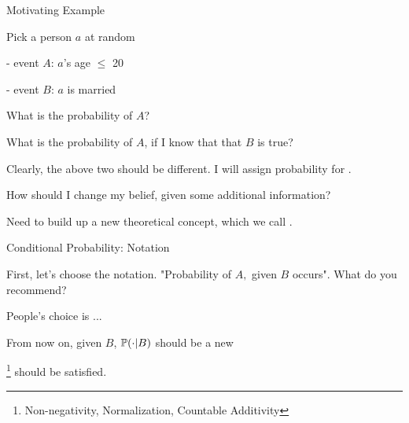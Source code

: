\documentclass[fleqn,aspectratio=169]{beamer}
\begin{document}

\begin{frame}{Motivating Example}

\plitemsep 0.1in
\bci 

\item<1-> Pick a person $a$ at random

- event $A$: $a$'s age $\leq$ 20

- event $B$: $a$ is married


\item<2->  What is the probability of $A$?

\item<2->  What is the probability of $A$, if I know that that $B$ is true?

\item<3-> Clearly, the above two should be different. I will assign  probability for .

\item<4->  How should I change my belief, given some additional information?

\item<5-> Need to build up a new theoretical concept, which we call .

\eci 

\end{frame}

\begin{frame}{Conditional Probability: Notation}

\bci

\item<1-> First, let's choose the notation. "Probability of $A,$ given $B$ occurs". What do you recommend?

\item<3-> People's choice is ... 

\item<5-> From now on, given $B$, $\mathbb{P}( \cdot | B )$ should be a new 
\bci
\item<6-> \footnote{Non-negativity, Normalization, Countable Additivity}  should be satisfied.
\eci

\eci 

\end{frame}
\end{document}

